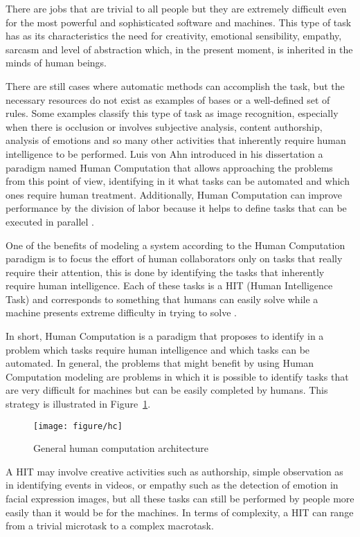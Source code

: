 There are jobs that are trivial to all people but they are extremely difficult even for the most powerful and sophisticated software and machines. This type of task has as its characteristics the need for creativity, emotional sensibility, empathy, sarcasm and level of abstraction which, in the present moment, is inherited in the minds of human beings.

There are still cases where automatic methods can accomplish the task, but the necessary resources do not exist as examples of bases or a well-defined set of rules.
Some examples classify this type of task as image recognition, especially when there is occlusion or involves subjective analysis, content authorship, analysis of emotions and so many other activities that inherently require human intelligence to be performed. Luis von Ahn introduced in his dissertation  \cite{VonAhn:2005:HC:1168246}  a paradigm named Human Computation that allows approaching the problems from this point of view, identifying in it what tasks can be automated and which ones require human treatment. Additionally, Human Computation can improve performance by the division of labor because it helps to define tasks that can be executed in parallel  \cite{Rohwer:2010:NHC:1837885.1837897}.

One of the benefits of modeling a system according to the Human Computation paradigm is to focus the effort of human collaborators only on tasks that really require their attention, this is done by identifying the tasks that inherently require human intelligence. Each of these tasks is a HIT (Human Intelligence Task) and corresponds to something that humans can easily solve while a machine presents extreme difficulty in trying to solve \cite{doi:10.2200/S00371ED1V01Y201107AIM013}. 

In short, Human Computation is a paradigm that proposes to identify in a problem which tasks require human intelligence and which tasks can be automated. In general, the problems that might benefit by using Human Computation modeling are problems in which it is possible to identify tasks that are very difficult for machines but can be easily completed by humans. This strategy is illustrated in Figure~\ref{hc}.

\begin{figure}[ht]
\centering
\texttt{[image: figure/hc]}
\caption{General human computation architecture}
\label{hc}
\end{figure}

A HIT may involve creative activities such as authorship, simple observation as in identifying events in videos, or empathy such as the detection of emotion in facial expression images, but all these tasks can still be performed by people more easily than it would be for the machines. In terms of complexity, a HIT can range from a trivial microtask to a complex macrotask.

